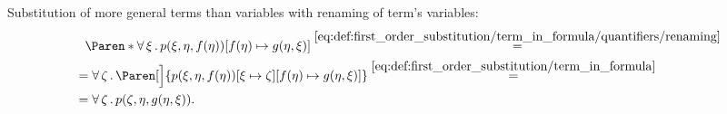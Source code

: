 \begin{example}
\begin{ExEnum}
     Substitution of more general terms than variables with renaming of term's variables:
    \begin{align*}
      &{}\phantom{=}{}
      \Paren*{\ForAll{\xi} p(\xi, \eta, f(\eta))}[f(\eta) \mapsto g(\eta, \xi)]
      \overset {\eqref{eq:def:first_order_substitution/term_in_formula/quantifiers/renaming}} = \\ &=
      \ForAll{\zeta} \Paren[\Big]{p(\xi, \eta, f(\eta))[\xi \mapsto \zeta][f(\eta) \mapsto g(\eta, \xi)]}
      \overset {\eqref{eq:def:first_order_substitution/term_in_formula}} = \\ &=
      \ForAll{\zeta} p(\zeta, \eta, g(\eta, \xi)).
    \end{align*}
  \end{ExEnum}
\end{example}

